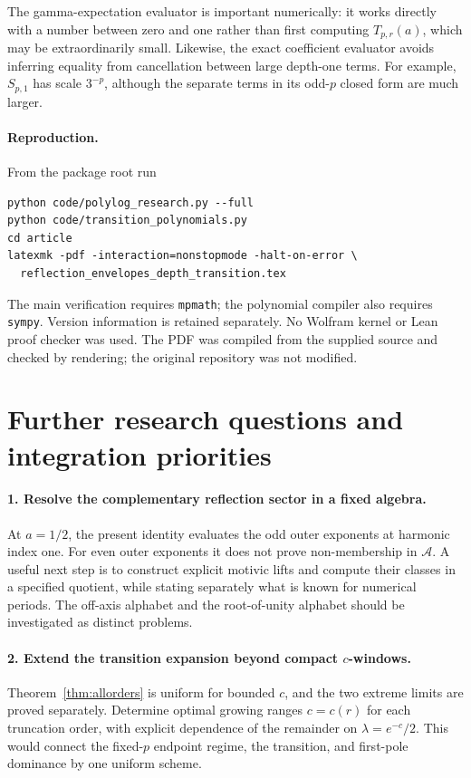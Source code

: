 \documentclass[11pt]{article}
\numberwithin{equation}{section}
\theoremstyle{definition}\newtheorem{definition}[theorem]{Definition}
\theoremstyle{remark}\newtheorem{remark}[theorem]{Remark}
\newcommand{\calA}{\mathcal A}
\newcommand{\src}[1]{\nolinkurl{#1}}
\begin{document}
The gamma-expectation evaluator is important numerically: it works directly with a number between zero and one rather than first computing $T_{p,r}(a)$, which may be extraordinarily small. Likewise, the exact coefficient evaluator avoids inferring equality from cancellation between large depth-one terms. For example, $S_{p,1}$ has scale $3^{-p}$, although the separate terms in its odd-$p$ closed form are much larger.

\paragraph{Reproduction.}
From the package root run
\begin{verbatim}
python code/polylog_research.py --full
python code/transition_polynomials.py
cd article
latexmk -pdf -interaction=nonstopmode -halt-on-error \
  reflection_envelopes_depth_transition.tex
\end{verbatim}
The main verification requires \src{mpmath}; the polynomial compiler also requires \src{sympy}. Version information is retained separately. No Wolfram kernel or Lean proof checker was used. The PDF was compiled from the supplied source and checked by rendering; the original repository was not modified.

\section{Further research questions and integration priorities}
\label{sec:future}

\paragraph{1. Resolve the complementary reflection sector in a fixed algebra.}
At $a=1/2$, the present identity evaluates the odd outer exponents at harmonic index one. For even outer exponents it does not prove non-membership in $\calA$. A useful next step is to construct explicit motivic lifts and compute their classes in a specified quotient, while stating separately what is known for numerical periods. The off-axis alphabet and the root-of-unity alphabet should be investigated as distinct problems.

\paragraph{2. Extend the transition expansion beyond compact $c$-windows.}
Theorem~\ref{thm:allorders} is uniform for bounded $c$, and the two extreme limits are proved separately. Determine optimal growing ranges $c=c(r)$ for each truncation order, with explicit dependence of the remainder on $\lambda=e^{-c}/2$. This would connect the fixed-$p$ endpoint regime, the transition, and first-pole dominance by one uniform scheme.
\end{document}
